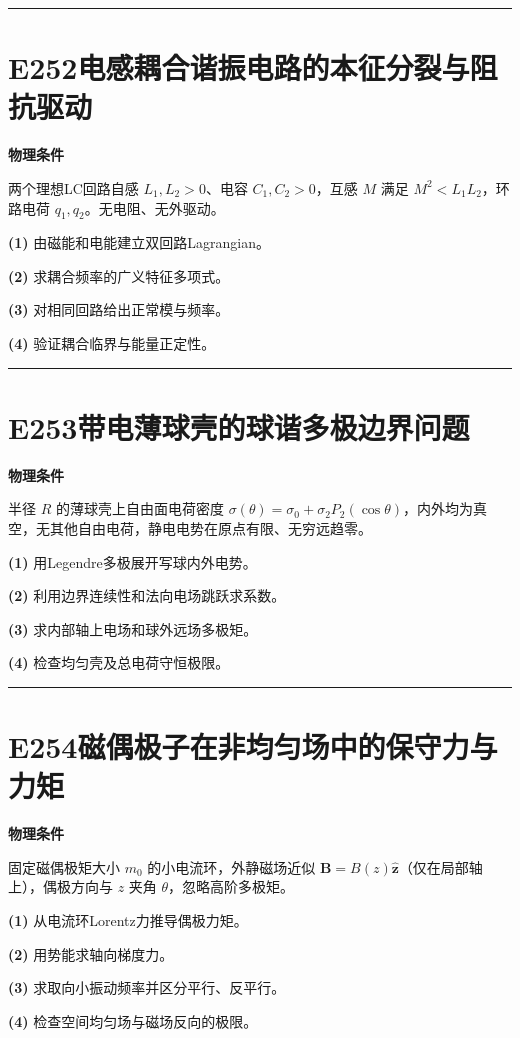 \documentclass[UTF8,a4paper,11pt,oneside,openany]{ctexbook}
\begin{document}
\par\bigskip\hrule\bigskip
\section*{E252\quad 电感耦合谐振电路的本征分裂与阻抗驱动}
\textbf{物理条件}\par 两个理想LC回路自感 \(L_1,L_2>0\)、电容 \(C_1,C_2>0\)，互感 \(M\) 满足 \(M^2<L_1L_2\)，环路电荷 \(q_1,q_2\)。无电阻、无外驱动。
\par\noindent\textbf{(1)} 由磁能和电能建立双回路Lagrangian。
\par\noindent\textbf{(2)} 求耦合频率的广义特征多项式。
\par\noindent\textbf{(3)} 对相同回路给出正常模与频率。
\par\noindent\textbf{(4)} 验证耦合临界与能量正定性。

\par\bigskip\hrule\bigskip
\section*{E253\quad 带电薄球壳的球谐多极边界问题}
\textbf{物理条件}\par 半径 \(R\) 的薄球壳上自由面电荷密度 \(\sigma(\theta)=\sigma_0+\sigma_2P_2(\cos\theta)\)，内外均为真空，无其他自由电荷，静电电势在原点有限、无穷远趋零。
\par\noindent\textbf{(1)} 用Legendre多极展开写球内外电势。
\par\noindent\textbf{(2)} 利用边界连续性和法向电场跳跃求系数。
\par\noindent\textbf{(3)} 求内部轴上电场和球外远场多极矩。
\par\noindent\textbf{(4)} 检查均匀壳及总电荷守恒极限。

\par\bigskip\hrule\bigskip
\section*{E254\quad 磁偶极子在非均匀场中的保守力与力矩}
\textbf{物理条件}\par 固定磁偶极矩大小 \(m_0\) 的小电流环，外静磁场近似 \(\boldsymbol B=B(z)\hat{\boldsymbol z}\)（仅在局部轴上），偶极方向与 \(z\) 夹角 \(\theta\)，忽略高阶多极矩。
\par\noindent\textbf{(1)} 从电流环Lorentz力推导偶极力矩。
\par\noindent\textbf{(2)} 用势能求轴向梯度力。
\par\noindent\textbf{(3)} 求取向小振动频率并区分平行、反平行。
\par\noindent\textbf{(4)} 检查空间均匀场与磁场反向的极限。
\end{document}
